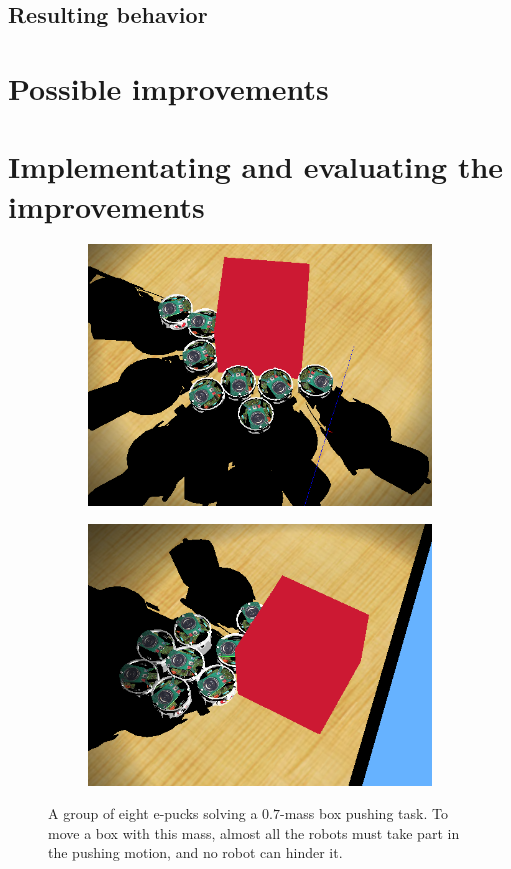 \documentclass[a4paper,10pt]{article}
\begin{document}
\subsection{Resulting behavior}

\section{Possible improvements}
\label{sec:b1}

\section{Implementating and evaluating the improvements}

\begin{figure}[!h]
    \centering

    \begin{subfigure}[!h]{0.45\textwidth}
        \includegraphics[width=\textwidth]{models/stresstest.PNG}
    \end{subfigure}
    \begin{subfigure}[!h]{0.45\textwidth}
        \includegraphics[width=\textwidth]{models/stresstest2.PNG}
    \end{subfigure}

    \caption{A group of eight e-pucks solving a $0.7$-mass box pushing task.
    To move a box with this mass, almost all the robots must take part in the
    pushing motion, and no robot can hinder it.}
\end{figure}


\label{sec:b2}
\end{document}
